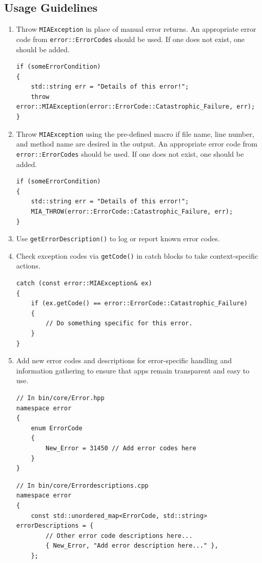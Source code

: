 \subsection*{Usage Guidelines}
\begin{enumerate}
	\item Throw \texttt{MIAException} in place of manual error returns. An appropriate error code from \texttt{error::ErrorCodes} should be used. If one does not exist, one should be added.
	\begin{lstlisting}[style=cppstyle]
if (someErrorCondition) 
{
    std::string err = "Details of this error!";
    throw error::MIAException(error::ErrorCode::Catastrophic_Failure, err); 
}
	\end{lstlisting}
	\item Throw \texttt{MIAException} using the pre-defined macro if file name, line number, and method name are desired in the output. An appropriate error code from \texttt{error::ErrorCodes} should be used. If one does not exist, one should be added.
	\begin{lstlisting}[style=cppstyle]
if (someErrorCondition) 
{
    std::string err = "Details of this error!";
    MIA_THROW(error::ErrorCode::Catastrophic_Failure, err); 
}
	\end{lstlisting}
	\item Use \texttt{getErrorDescription()} to log or report known error codes.
	\item Check exception codes via \texttt{getCode()} in catch blocks to take context-specific actions.
	\begin{lstlisting}[style=cppstyle]
catch (const error::MIAException& ex)
{
    if (ex.getCode() == error::ErrorCode::Catastrophic_Failure)
    {
    	// Do something specific for this error.
    }
}
	\end{lstlisting}
	\item Add new error codes and descriptions for error-specific handling and information gathering to ensure that apps remain transparent and easy to use.
	\begin{lstlisting}[style=cppstyle]
// In bin/core/Error.hpp
namespace error
{
    enum ErrorCode
    {
    	New_Error = 31450 // Add error codes here
    }
}
	\end{lstlisting}
	\begin{lstlisting}[style=cppstyle]
// In bin/core/Errordescriptions.cpp
namespace error
{
    const std::unordered_map<ErrorCode, std::string> errorDescriptions = {
    	// Other error code descriptions here...
        { New_Error, "Add error description here..." },
    };
	\end{lstlisting}
\end{enumerate}

